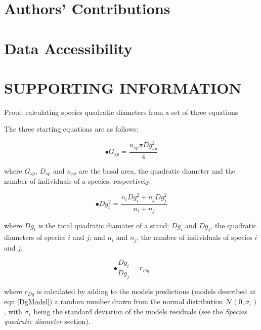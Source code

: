 \documentclass[a4paper]{article}
\begin{document}
\section*{Authors' Contributions}

\section*{Data Accessibility}




\clearpage

\section*{SUPPORTING INFORMATION}


\clearpage

\noindent Proof: calculating species quadratic diameters from a set of three equations

\noindent The three starting equations are as follows:

\begin{equation}\label{one}\tag{a}
  \bullet G_{sp} = \frac{n_{sp}\pi Dg_{sp}^2}{4}
\end{equation}

\noindent where $G_{sp}$, $D_{sp}$ and $n_{sp}$ are the basal area, the quadratic diameter and the number of individuals of a species, respectively.

\begin{equation}\label{two}\tag{b}
  \bullet Dg_t^2 = \frac{n_iDg_i^2 + n_jDg_j^2}{n_i + n_j}
\end{equation}

\noindent where $Dg_t$ is the total quadratic diamater of a stand; $Dg_i$ and $Dg_j$, the quadratic diameters of species $i$ and $j$; and $n_i$ and $n_j$, the number of individuals of species $i$ and $j$.

\begin{equation}\label{three}\tag{c}
  \bullet \frac{Dg_i}{Dg_j} = r_{Dg}
\end{equation}

\noindent where $r_{Dg}$ is calculated by adding to the models predictions (models described at eqn \ref{DgModel}) a random number drawn from the normal distribution $\mathcal{N} (0, \sigma_\varepsilon)$, with $\sigma_\varepsilon$ being the standard deviation of the models residuals (see the \textit{Species quadratic diameter} section).
\end{document}

